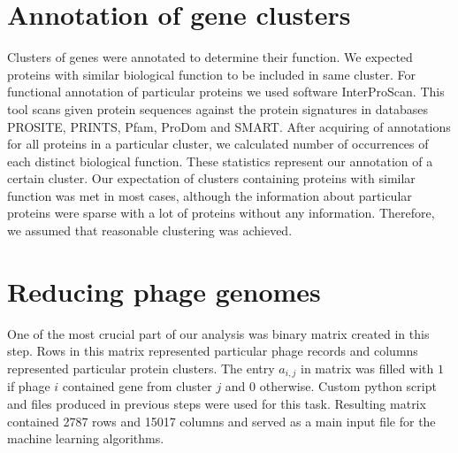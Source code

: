 


\section{Annotation of gene clusters}
Clusters of genes were annotated to determine their function.
We expected proteins with similar biological function to be included in same cluster.
For functional annotation of particular proteins we used software InterProScan\cite{interpro}.
This tool scans given protein sequences against the protein signatures in databases PROSITE\cite{prosite}, PRINTS\cite{prints}, Pfam\cite{pfam}, ProDom\cite{prodom} and SMART\cite{smart}.
After acquiring of annotations for all proteins in a particular cluster, we calculated number of occurrences of each distinct biological function.
These statistics represent our annotation of a certain cluster.
Our expectation of clusters containing proteins with similar function was met in most cases, although the information about particular proteins were sparse with a lot of proteins without any information.
Therefore, we assumed that reasonable clustering was achieved.

\section{Reducing phage genomes}
One of the most crucial part of our analysis was binary matrix created in this step.
Rows in this matrix represented particular phage records and columns represented particular protein clusters.
The entry $a_{i,j}$ in matrix was filled with $1$ if phage $i$ contained gene from cluster $j$ and $0$ otherwise.
Custom python script and files produced in previous steps were used for this task.
Resulting matrix contained 2787 rows and 15017 columns and served as a main input file for the machine learning algorithms.
